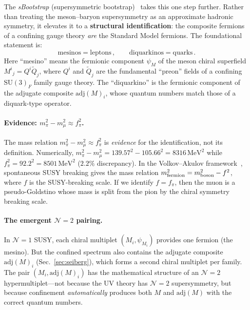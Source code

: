 \documentclass[aps,prd,twocolumn,showpacs,preprintnumbers,superscriptaddress,floatfix]{revtex4-2}
\newcommand{\SU}{\mathrm{SU}}
\newcommand{\adj}{\mathrm{adj}}
\newcommand{\MeV}{\,\mathrm{MeV}}
\begin{document}
The \emph{sBootstrap} (supersymmetric
bootstrap)~\cite{Rivero:2024epjc} takes this one step further.
Rather than treating the meson--baryon supersymmetry as an
approximate hadronic symmetry, it elevates it to a
\textbf{structural identification}: the composite fermions of a
confining gauge theory \emph{are} the Standard Model fermions.
The foundational statement is:
\begin{equation}
  \boxed{
  \text{mesinos} = \text{leptons}\,,
  \qquad
  \text{diquarkinos} = \text{quarks}\,.}
  \label{eq:sbootstrap_def}
\end{equation}
Here ``mesino'' means the fermionic component $\psi_M$ of the
meson chiral superfield $M^i{}_j = Q^i\tilde{Q}_j$, where
$Q^i$ and $\tilde{Q}_j$ are the fundamental ``preon'' fields of
a confining $\SU(3)_F$ family gauge theory.
The ``diquarkino'' is the fermionic component of the adjugate
composite $\adj(M)_i$, whose quantum numbers match those of a
diquark-type operator.

\paragraph{Evidence: $m_\pi^2 - m_\mu^2 \approx f_\pi^2$.}
The mass relation $m_\pi^2 - m_\mu^2 \approx f_\pi^2$
is \emph{evidence} for the identification, not its definition.
Numerically, $m_\pi^2 - m_\mu^2 = 139.57^2 - 105.66^2 =
8316\MeV^2$ while $f_\pi^2 = 92.2^2 = 8501\MeV^2$ ($2.2\%$
discrepancy).
In the Volkov--Akulov framework~\cite{VolkovAkulov:1973},
spontaneous SUSY breaking gives the mass relation
$m_{\rm fermion}^2 = m_{\rm boson}^2 - f^2$, where $f$ is the
SUSY-breaking scale.
If we identify $f = f_\pi$, then the muon is a pseudo-Goldstino
whose mass is split from the pion by the chiral symmetry
breaking scale.

\paragraph{The emergent $\mathcal{N}{=}2$ pairing.}
In $\mathcal{N}{=}1$ SUSY, each chiral multiplet
$(M_i, \psi_{M_i})$ provides one fermion (the mesino).
But the confined spectrum also contains the adjugate composite
$\adj(M)_i$ (Sec.~\ref{sec:seiberg}), which forms a second
chiral multiplet per family.
The pair $(M_i, \adj(M)_i)$ has the mathematical structure of an
$\mathcal{N}{=}2$ hypermultiplet---not because the UV theory has
$\mathcal{N}{=}2$ supersymmetry, but because confinement
\emph{automatically} produces both $M$ and $\adj(M)$ with the
correct quantum numbers.
\end{document}
